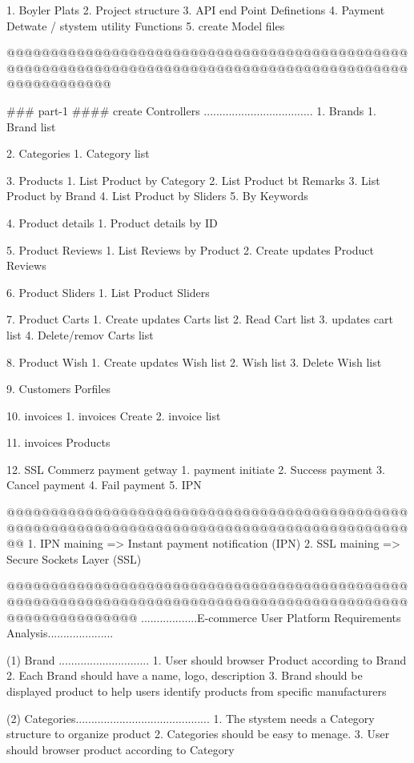 1. Boyler Plats 
2. Project structure 
3. API end Point Definetions
4. Payment Detwate / stystem  utility Functions 
5. create Model files

@@@@@@@@@@@@@@@@@@@@@@@@@@@@@@@@@@@@@@@@@@@@@@@@@@@@@@@@@@@@@@@@@@@@@@@@@@@@@@@@@@@@@@@@@@@@@@@@@@@@@@@@

### part-1 #### create Controllers ...................................
1. Brands
   1. Brand list 

2. Categories
   1. Category list

3. Products
   1. List Product by Category
   2. List Product bt Remarks
   3. List Product by Brand
   4. List Product by Sliders
   5. By Keywords

4. Product details
   1. Product details by ID

5. Product Reviews
   1. List Reviews by Product
   2. Create updates Product Reviews

6. Product Sliders
   1. List Product Sliders

7. Product Carts 
   1. Create updates Carts list
   2. Read Cart list
   3. updates cart list 
   4. Delete/remov Carts list

8. Product Wish
   1. Create updates Wish list
   2. Wish list
   3. Delete Wish list

9. Customers Porfiles

10. invoices
    1. invoices Create
    2. invoice list

11. invoices Products

12. SSL Commerz payment getway 
    1. payment initiate
    2. Success payment 
    3. Cancel payment
    4. Fail payment
    5. IPN


@@@@@@@@@@@@@@@@@@@@@@@@@@@@@@@@@@@@@@@@@@@@@@@@@@@@@@@@@@@@@@@@@@@@@@@@@@@@@@@@@@@@@@@@@@@@@@
 1. IPN maining =>  Instant payment notification (IPN)
 2. SSL maining =>  Secure Sockets Layer (SSL)

 @@@@@@@@@@@@@@@@@@@@@@@@@@@@@@@@@@@@@@@@@@@@@@@@@@@@@@@@@@@@@@@@@@@@@@@@@@@@@@@@@@@@@@@@@@@@@@@@@@@@@@@@@@@
 ..................E-commerce User Platform Requirements Analysis.....................

(1) Brand .............................
    1. User should browser Product according to Brand
    2. Each Brand should have a name, logo, description
    3. Brand should be displayed product to help users identify products from specific manufacturers

(2) Categories...........................................
    1. The stystem needs a Category structure to organize product
    2. Categories should be easy to menage.
    3. User should browser product according to Category


